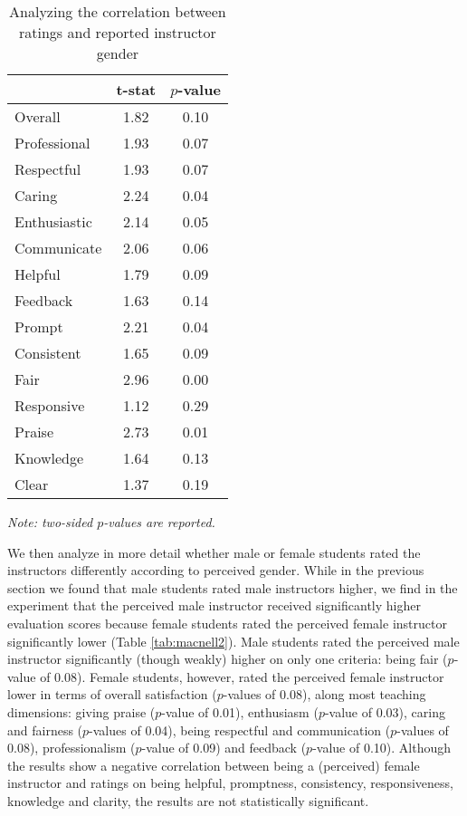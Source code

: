 \documentclass[12pt]{article}
\begin{document}
\begin{table}[htbp]
  \centering
  \footnotesize 
  \caption{Analyzing the correlation between ratings and reported instructor gender}
    \begin{tabular}{lcc}
    \toprule 
                          & t-stat  & $p$-value  \\
   \midrule
    Overall &                 1.82       & 0.10   \\
    Professional &            1.93       & 0.07   \\
    Respectful			   &  1.93       & 0.07   \\
    Caring &                  2.24       & 0.04    \\
    Enthusiastic   &          2.14       & 0.05     \\
    Communicate        &      2.06       & 0.06     \\
    Helpful   &               1.79       & 0.09     \\
    Feedback   &              1.63       & 0.14     \\
    Prompt    &               2.21       & 0.04     \\
    Consistent   &            1.65       & 0.09     \\
    Fair   &                  2.96       & 0.00     \\
    Responsive   &            1.12       & 0.29     \\
    Praise   &                2.73       & 0.01     \\
    Knowledge   &             1.64       & 0.13     \\
    Clear   &                 1.37       & 0.19     \\
    \bottomrule
    \end{tabular}%
 \label{tab:macnell1}%
  
  \textit{Note: two-sided $p$-values are reported.}
\end{table}%
\normalsize


We then analyze in more detail whether male or female students rated the instructors differently according to perceived gender. While in the previous section we found that male students rated male instructors higher, we find in the \citet{MacNell2014} experiment that the perceived male instructor received significantly higher evaluation scores because female students rated the perceived female instructor significantly lower (Table  \ref{tab:macnell2}). Male students rated the perceived male instructor significantly (though weakly) higher on only one criteria: being fair ($p$-value of 0.08). Female students, however, rated the perceived female instructor lower in terms of overall satisfaction ($p$-values of 0.08), along most teaching dimensions: giving praise ($p$-value of 0.01), enthusiasm ($p$-value of 0.03), caring and fairness ($p$-values of 0.04), being respectful and communication ($p$-values of 0.08), professionalism ($p$-value of 0.09) and feedback ($p$-value of 0.10). Although the results show a negative correlation between being a (perceived) female instructor and ratings on being helpful, promptness, consistency, responsiveness, knowledge and clarity, the results are not statistically significant.
\end{document}
